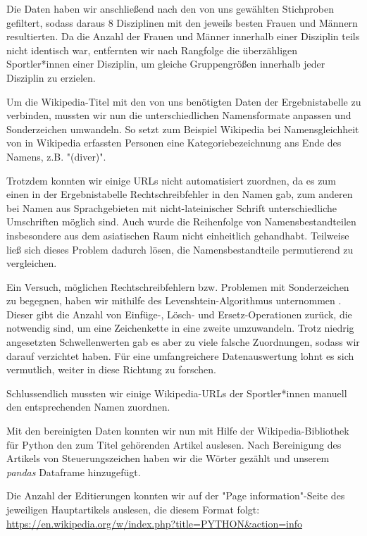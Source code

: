 \documentclass[11pt]{article}
\begin{document}
Die Daten haben wir anschließend nach den von uns gewählten Stichproben gefiltert, sodass daraus 8 Disziplinen mit den jeweils besten Frauen und Männern resultierten. Da die Anzahl der Frauen und Männer innerhalb einer Disziplin teils nicht identisch war, entfernten wir nach Rangfolge die überzähligen Sportler*innen einer Disziplin, um gleiche Gruppengrößen innerhalb jeder Disziplin zu erzielen.

Um die Wikipedia-Titel mit den von uns benötigten Daten der Ergebnistabelle zu verbinden, mussten wir nun die unterschiedlichen Namensformate anpassen und Sonderzeichen umwandeln. So setzt zum Beispiel Wikipedia bei Namensgleichheit von in Wikipedia erfassten Personen eine Kategoriebezeichnung ans Ende des Namens, z.B. "(diver)".

Trotzdem konnten wir einige URLs nicht automatisiert zuordnen, da es zum einen in der Ergebnistabelle Rechtschreibfehler in den Namen gab, zum anderen bei Namen aus Sprachgebieten mit nicht-lateinischer Schrift unterschiedliche Umschriften möglich sind. Auch wurde die Reihenfolge von Namensbestandteilen insbesondere aus dem asiatischen Raum nicht einheitlich gehandhabt. Teilweise ließ sich dieses Problem dadurch lösen, die Namensbestandteile permutierend zu vergleichen. 

Ein Versuch, möglichen Rechtschreibfehlern bzw. Problemen mit Sonderzeichen zu begegnen, haben wir mithilfe des Levenshtein-Algorithmus unternommen \parencite{Sulzberger2019}. Dieser gibt die Anzahl von Einfüge-, Lösch- und Ersetz-Operationen zurück, die notwendig sind, um eine Zeichenkette in eine zweite umzuwandeln. Trotz niedrig angesetzten Schwellenwerten gab es aber zu viele falsche Zuordnungen, sodass wir darauf verzichtet haben. Für eine umfangreichere Datenauswertung lohnt es sich vermutlich, weiter in diese Richtung zu forschen. 

Schlussendlich mussten wir einige Wikipedia-URLs der Sportler*innen manuell den entsprechenden Namen zuordnen. 

Mit den bereinigten Daten konnten wir nun mit Hilfe der Wikipedia-Bibliothek für Python \cite{goldsmith} den zum Titel gehörenden Artikel auslesen. Nach Bereinigung des Artikels von Steuerungszeichen haben wir die Wörter gezählt und unserem \textit{pandas} Dataframe hinzugefügt. 

Die Anzahl der Editierungen konnten wir auf der "Page information"-Seite des jeweiligen Hauptartikels auslesen, die diesem Format folgt:
\url{https://en.wikipedia.org/w/index.php?title=PYTHON&action=info}
\end{document}
